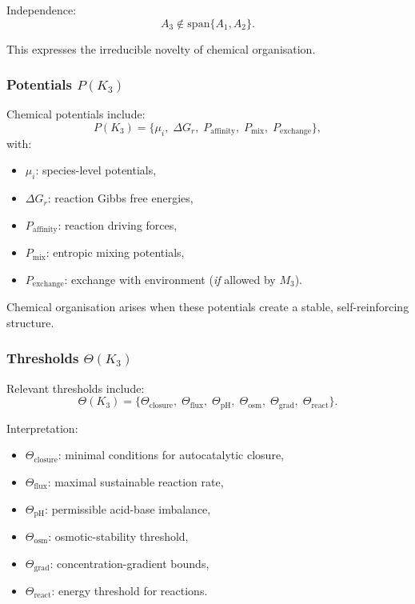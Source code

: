 Independence:
\[
A_3 \notin \mathrm{span}\{A_1,A_2\}.
\]

This expresses the irreducible novelty of chemical organisation.

\subsubsection{Potentials \texorpdfstring{$P(K_3)$}{P(K_3)}}

Chemical potentials include:
\[
P(K_3) = \{ \mu_i,\; \Delta G_r,\; P_{\mathrm{affinity}},\;
           P_{\mathrm{mix}},\; P_{\mathrm{exchange}}\},
\]
with:
\begin{itemize}
    \item $\mu_i$: species-level potentials,
    \item $\Delta G_r$: reaction Gibbs free energies,
    \item $P_{\mathrm{affinity}}$: reaction driving forces,
    \item $P_{\mathrm{mix}}$: entropic mixing potentials,
    \item $P_{\mathrm{exchange}}$: exchange with environment (\emph{if}
          allowed by $M_3$).
\end{itemize}

Chemical organisation arises when these potentials create a stable,
self-reinforcing structure.

\subsubsection{Thresholds \texorpdfstring{$\Theta(K_3)$}{\Theta(K_3)}}

Relevant thresholds include:
\[
\Theta(K_3) =
\{\Theta_{\mathrm{closure}},\;
  \Theta_{\mathrm{flux}},\;
  \Theta_{\mathrm{pH}},\;
  \Theta_{\mathrm{osm}},\;
  \Theta_{\mathrm{grad}},\;
  \Theta_{\mathrm{react}}\}.
\]

Interpretation:
\begin{itemize}
    \item $\Theta_{\mathrm{closure}}$: minimal conditions for
          autocatalytic closure,
    \item $\Theta_{\mathrm{flux}}$: maximal sustainable reaction rate,
    \item $\Theta_{\mathrm{pH}}$: permissible acid-base imbalance,
    \item $\Theta_{\mathrm{osm}}$: osmotic-stability threshold,
    \item $\Theta_{\mathrm{grad}}$: concentration-gradient bounds,
    \item $\Theta_{\mathrm{react}}$: energy threshold for reactions.
\end{itemize}

